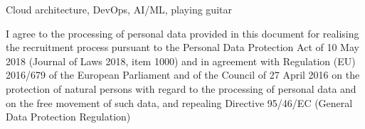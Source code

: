 \documentclass{cvClass} %
\begin{document}

   {Cloud architecture, DevOps, AI/ML, playing guitar}

  \vfill
    {I agree to the processing of personal data provided in this document for realising the recruitment process pursuant to the Personal Data Protection Act of 10 May 2018 (Journal of Laws 2018, item 1000) and in agreement with Regulation (EU) 2016/679 of the European Parliament and of the Council of 27 April 2016 on the protection of natural persons with regard to the processing of personal data and on the free movement of such data, and repealing Directive 95/46/EC (General Data Protection Regulation)}

\end{document}

